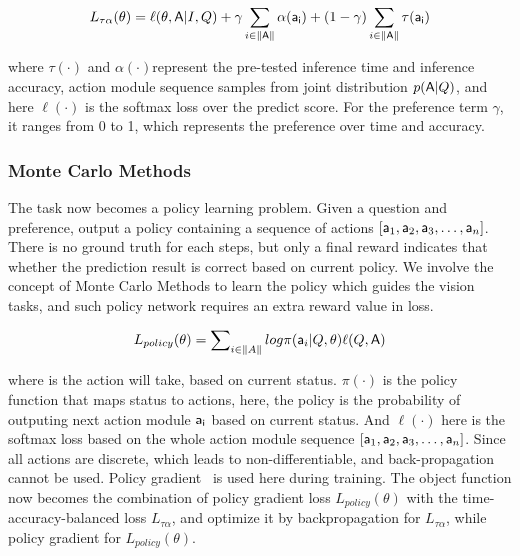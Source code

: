 \begin{small}
\begin{equation} 
    L_{\tau\alpha}(\theta) = \ell(\theta,{\mathsf{A}}|I, Q) + \gamma\sum_{i\in\|{\mathsf{A}}\|}\alpha({\mathsf{a_i}}) + (1-\gamma)\sum_{i\in\|{\mathsf{A}}\|}\tau({\mathsf{a_i}})
\end{equation}
\end{small}

\noindent where $\tau(\cdot)$ and $\alpha(\cdot)$represent the pre-tested inference time and inference accuracy, action module sequence  samples from joint distribution $p({\mathsf{A}}|Q)$, and here $\ell(\cdot)$ is the softmax loss over the predict score. For the preference term $\gamma$, it ranges from 0 to 1, which represents the preference over time and accuracy.

\subsubsection{Monte Carlo Methods}
\label{sec-MC}
\hspace{\parindent} The task now becomes a policy learning problem. Given a question and preference, output a policy containing a sequence of actions $[{\mathsf{a}}_1,{\mathsf{a}}_2,{\mathsf{a}}_3,\dots,{\mathsf{a}}_n]$. There is no ground truth for each steps, but only a final reward indicates that whether the prediction result is correct based on current policy. We involve the concept of Monte Carlo Methods to learn the policy which guides the vision tasks, and such policy network requires an extra reward value in loss.

\begin{small}
\begin{equation} 
    L_{policy}(\theta) = \sum\nolimits_{i\in\|A\|} log\pi({\mathsf{a}}_{i}|Q,\theta)\ell(Q,{\mathsf{A}})
\end{equation}
\end{small}

\noindent where  is the action will take, based on current status. $\pi(\cdot)$ is the policy function that maps status to actions, here, the policy is the probability of outputing next action module ${\mathsf{a_{i}}}$ based on current status. And $\ell(\cdot)$ here is the softmax loss based on the whole action module sequence $[{\mathsf{a}}_1,{\mathsf{a}}_2,{\mathsf{a}}_3,\dots,{\mathsf{a}}_n]$. Since all actions are discrete, which leads to non-differentiable, and back-propagation cannot be used. Policy gradient~\cite{Liu_2017_ICCV} is used here during training. The object function now becomes the combination of policy gradient loss $L_{policy}(\theta)$ with the time-accuracy-balanced loss $L_{\tau\alpha}$, and optimize it by backpropagation for $L_{\tau\alpha}$, while policy gradient for $L_{policy}(\theta)$.


